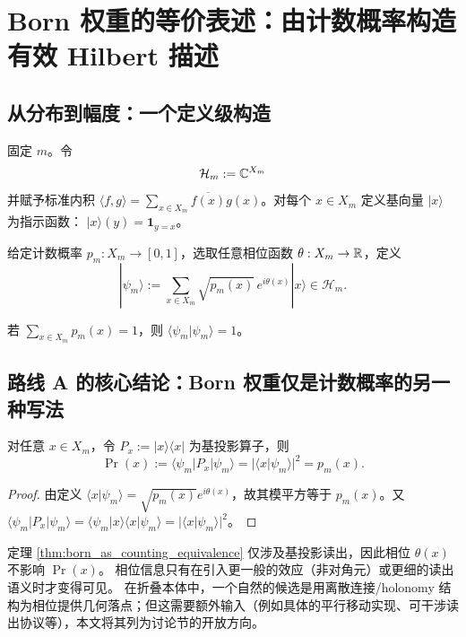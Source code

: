 \section{Born 权重的等价表述：由计数概率构造有效 Hilbert 描述}

\subsection{从分布到幅度：一个定义级构造}

\begin{definition}
\label{def:effective_hilbert_space}
固定 $m$。令
$$
\mathcal H_m:=\mathbb{C}^{X_m}
$$
并赋予标准内积 $\langle f,g\rangle=\sum_{x\in X_m}\overline{f(x)}g(x)$。对每个 $x\in X_m$ 定义基向量 $|x\rangle$ 为指示函数：
$|x\rangle(y)=\mathbf 1_{y=x}$。
\end{definition}

\begin{definition}[由计数概率诱导的态向量族]
\label{def:psi_from_p}
给定计数概率 $p_m:X_m\to[0,1]$，选取任意相位函数 $\theta:X_m\to\mathbb{R}$，定义
$$
|\psi_m\rangle:=\sum_{x\in X_m}\sqrt{p_m(x)}\,e^{i\theta(x)}|x\rangle\in\mathcal H_m.
$$
\end{definition}

\begin{proposition}[归一性]
\label{prop:psi_normalized}
若 $\sum_{x\in X_m}p_m(x)=1$，则 $\langle\psi_m|\psi_m\rangle=1$。
\end{proposition}

\subsection{路线 A 的核心结论：Born 权重仅是计数概率的另一种写法}

\begin{theorem}
\label{thm:born_as_counting_equivalence}
对任意 $x\in X_m$，令 $P_x:=|x\rangle\langle x|$ 为基投影算子，则
$$
\Pr(x)
:=\langle \psi_m|P_x|\psi_m\rangle
=|\langle x|\psi_m\rangle|^2
=p_m(x).
$$
\end{theorem}

\begin{proof}
由定义 $\langle x|\psi_m\rangle=\sqrt{p_m(x)}e^{i\theta(x)}$，故其模平方等于 $p_m(x)$。又 $\langle\psi_m|P_x|\psi_m\rangle=\langle\psi_m|x\rangle\langle x|\psi_m\rangle=|\langle x|\psi_m\rangle|^2$。
\end{proof}

\begin{remark}[相位的地位与开放项]
定理 \ref{thm:born_as_counting_equivalence} 仅涉及基投影读出，因此相位 $\theta(x)$ 不影响 $\Pr(x)$。
相位信息只有在引入更一般的效应（非对角元）或更细的读出语义时才变得可见。
在折叠本体中，一个自然的候选是用离散连接/holonomy 结构为相位提供几何落点；但这需要额外输入（例如具体的平行移动实现、可干涉读出协议等），本文将其列为讨论节的开放方向。
\end{remark}

